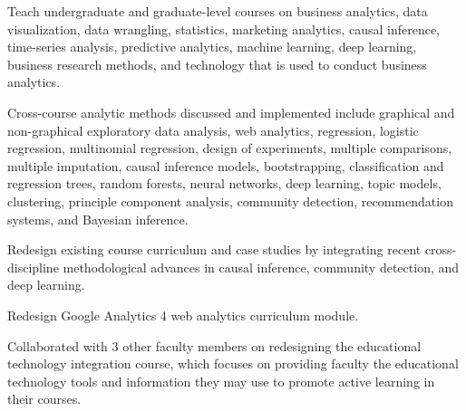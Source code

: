 \begin{zitemize}
\item  Teach undergraduate and graduate-level courses on business analytics, data visualization, data wrangling, statistics, marketing analytics, causal inference, time-series analysis, predictive analytics, machine learning, deep learning, business research methods, and technology that is used to conduct business analytics. %
\vspace{0.2em}
\item Cross-course analytic methods discussed and implemented include graphical and non-graphical exploratory data analysis, web analytics, regression, logistic regression, multinomial regression, design of experiments, multiple comparisons, multiple imputation, causal inference models, bootstrapping, classification and regression trees, random forests, neural networks, deep learning, topic models, clustering, principle component analysis, community detection, recommendation systems, and Bayesian inference. 
\vspace{0.2em}
\item Redesign existing course curriculum and case studies by integrating recent cross-discipline methodological advances in causal inference, community detection, and deep learning. 
\item Redesign Google Analytics 4 web analytics curriculum module. 
\item Collaborated with 3 other faculty members on redesigning the educational technology integration course, which focuses on providing faculty the educational technology tools and information they may use to promote active learning in their courses. 
\end{zitemize}
